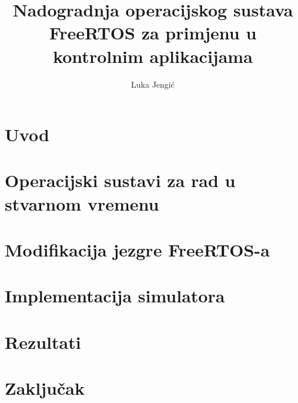 \documentclass[times, utf8, zavrsni]{fer}
\begin{document}

\title{Nadogradnja operacijskog sustava FreeRTOS za primjenu u kontrolnim aplikacijama}

\author{Luka Jengić}

\maketitle

\izvornik


\renewcommand\contentsname{Sadržaj}
\tableofcontents

\chapter{Uvod} 


\chapter{Operacijski sustavi za rad u stvarnom vremenu}


\chapter{Modifikacija jezgre FreeRTOS-a}


\chapter{Implementacija simulatora}


\chapter{Rezultati}


\chapter{Zaključak}

\end{document}
